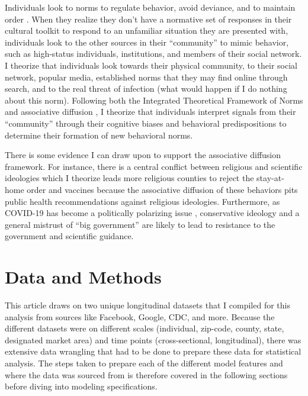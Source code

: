 Individuals look to norms to regulate behavior, avoid deviance, and to maintain
order \citep{horneNormsIntegratedFramework2020,
shepherdStructurePerceptionHow2017}. When they realize they don't have a
normative set of responses in their cultural toolkit to respond to an unfamiliar
situation they are presented with, individuals look to the other sources in
their ``community'' to mimic behavior, such as high-status individuals,
institutions, and members of their social network. I theorize that individuals
look towards their physical community, to their social network, popular media,
established norms that they may find online through search, and to the real
threat of infection (what would happen if I do nothing about this norm).
Following both the Integrated Theoretical Framework of Norms
\citep{horneNormsIntegratedFramework2020} and associative diffusion
\citep{dellapostaWhyLiberalsDrink2015, goldbergSocialContagionAssociative2018},
I theorize that individuals interpret signals from their ``community'' through
their cognitive biases and behavioral predispositions to determine their
formation of new behavioral norms.

There is some evidence I can draw upon to support the associative diffusion
framework. For instance, there is a central conflict between religious and
scientific ideologies which I theorize leads more religious counties to reject
the stay-at-home order and vaccines
\citep{evansReligionScienceEpistemological2008} because the associative
diffusion of these behaviors pits public health recommendations against
religious ideologies. Furthermore, as COVID-19 has become a politically
polarizing issue \citep{ternullo22}, conservative ideology and a general
mistrust of ``big government'' \citep{frank2007, gauchat2008} are likely to lead
to resistance to the government and scientific guidance.

\hypertarget{data-and-methods}{\section{Data and Methods}\label{data-and-methods}}

This article draws on two unique longitudinal datasets that I compiled for this
analysis from sources like Facebook, Google, CDC, and more. Because the
different datasets were on different scales (individual, zip-code, county,
state, designated market area) and time points (cross-sectional, longitudinal),
there was extensive data wrangling that had to be done to prepare these data for
statistical analysis. The steps taken to prepare each of the different model
features and where the data was sourced from is therefore covered in the
following sections before diving into modeling specifications.

